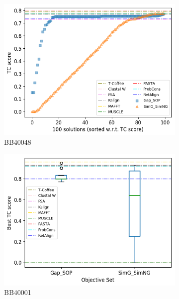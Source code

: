 \begin{figure}[!htbp]
\begin{adjustwidth}{-1cm}{-1cm}
\begin{subfigure}{0.22\textwidth}
			\includegraphics[width=\columnwidth]{Figure/summary/precomputedInit/Balibase/BB40048_tc_density_single_run_2}
			\caption{BB40048}
		\end{subfigure}
		\begin{subfigure}{0.22\textwidth}
			\includegraphics[width=\columnwidth]{Figure/summary/precomputedInit/Balibase/BB40001_objset_tc_rank_2}
			\caption{BB40001}
		\end{subfigure}	
		\begin{subfigure}{0.22\textwidth}

\end{subfigure}
\end{adjustwidth}
\end{figure}
